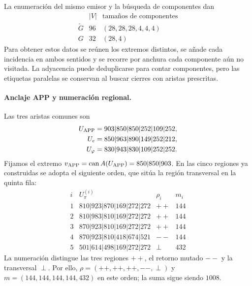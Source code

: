 La enumeración del mismo emisor y la búsqueda de componentes dan
\begin{equation}
\begin{array}{c|r|l}
 & |V|&\text{tamaños de componentes}\\ \hline
 \widetilde G&96&(28,28,28,4,4,4)\\
 G&32&(28,4)
\end{array}
\label{regcl27:componentes}
\end{equation}
Para obtener estos datos se reúnen los extremos distintos, se añade
cada incidencia en ambos sentidos y se recorre por anchura cada
componente aún no visitada. La adyacencia puede deduplicarse para contar
componentes, pero las etiquetas paralelas se conservan al buscar cierres
con aristas prescritas.

\paragraph{Anclaje APP y numeración regional.}
Las tres aristas comunes son
\begin{equation}
\begin{aligned}
 U_{\rm APP}&=903|850|850|252|109|252,\\
 U_e&=850|963|890|149|252|212,\\
 U_\varphi&=830|943|830|109|252|252.
\end{aligned}
\label{regcl27:anclajes}
\end{equation}
Fijamos el extremo
\(v_{\rm APP}=\operatorname{can}A(U_{\rm APP})=850|850|903\).
En las cinco regiones ya construidas se adopta el siguiente orden,
que sitúa la región transversal en la quinta fila:
\begin{equation}
\begin{array}{c|l|c|r}
 i&U_\pi^{(i)}&\rho_i&m_i\\ \hline
 1&810|923|870|169|272|272&++&144\\
 2&810|983|810|169|272|272&++&144\\
 3&870|923|810|169|272|272&++&144\\
 4&870|923|810|418|674|521&--&144\\
 5&501|614|498|169|272|272&\perp&432
\end{array}
\label{regcl27:regiones}
\end{equation}
La numeración distingue las tres regiones \(++\), el retorno mutado
\( -- \) y la transversal \(\perp\). Por ello,
\(\rho=(++ ,++ ,++ ,--,\perp)\) y
\(m=(144,144,144,144,432)\) en este orden; la suma sigue siendo \(1008\).

